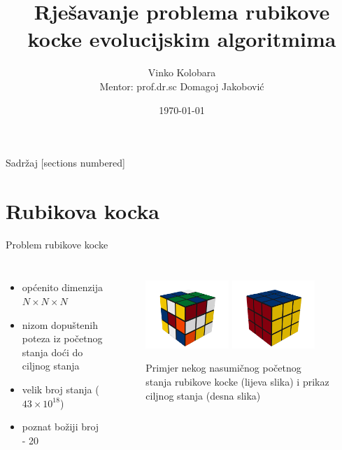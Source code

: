 \documentclass{beamer}
\title{Rješavanje problema rubikove kocke evolucijskim algoritmima}
\date{\today}
\author[Vinko Kolobara]{Vinko Kolobara\\{\small Mentor: prof.dr.sc Domagoj Jakobović}}
\institute{Fakultet elektrotehnike i računarstva, Zagreb, Hrvatska}
\begin{document}
  \maketitle
  
  \begin{frame}{Sadržaj}
  [sections numbered]
  \tableofcontents
\end{frame}
  
  \section{Rubikova kocka}
  \begin{frame}{Problem rubikove kocke}
    \begin{columns}[T,onlytextwidth]
		\begin{itemize}[<+- | alert@+>]
			\item općenito dimenzija $N\times N \times N$
			\item nizom dopuštenih poteza iz početnog stanja doći do ciljnog stanja
			\item velik broj stanja ($43 \times 10^{18}$)
			\item poznat božiji broj - 20
		\end{itemize}	
			    	    	
    	\begin{figure}[h]
			\centering
			\includegraphics[width=0.45\textwidth]{../image/rubik_cube_scrambled.png}
			\includegraphics[width=0.45\textwidth]{../image/rubik_cube_solved.png}
			\caption{Primjer nekog nasumičnog početnog stanja rubikove kocke (lijeva slika) i prikaz ciljnog stanja (desna slika) }
		\end{figure}
    	
    \end{columns}
  \end{frame}
    
\end{document}
